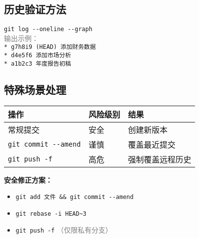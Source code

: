 \subsection{历史验证方法}
\begin{center}
    \texttt{git log {-}{-}oneline {-}{-}graph} \\
    \textcolor{gray}{输出示例：} \\
    \texttt{* g7h8i9 (HEAD) 添加财务数据} \\
    \texttt{* d4e5f6 添加市场分析} \\
    \texttt{* a1b2c3 年度报告初稿}
\end{center}

\subsection{特殊场景处理}
\begin{center}
\begin{tabular}{lll}
    \toprule
    \textbf{操作} & \textbf{风险级别} & \textbf{结果} \\
    \midrule
    常规提交 & 安全 & 创建新版本 \\
    \texttt{git commit {-}{-}amend} & 谨慎 & 覆盖最近提交 \\
    \texttt{git push -f} & 高危 & 强制覆盖远程历史 \\
    \bottomrule
\end{tabular}
\end{center}

\textbf{安全修正方案：}
\begin{itemize}[leftmargin=*, nosep]
    \item \texttt{git add 文件 \&\& git commit {-}{-}amend}
    \item \texttt{git rebase -i HEAD\~{}3}
    \item \texttt{git push -f} \textcolor{gray}{（仅限私有分支）}
\end{itemize}

